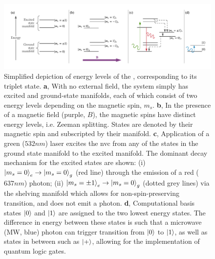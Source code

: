\begin{figure}
    \begin{center}
        \includegraphics[width=0.75\linewidth]{experimental_study/figures/nv_centre_cartoon.pdf}
    \end{center}
    \caption[ energy levels.]{
        Simplified depiction of energy levels of the , corresponding to its triplet state. 
        \textbf{a}, With no external field, the system simply has excited and ground-state manifolds, 
        each of which consist of two energy levels depending on the magnetic spin, $m_s$.
        \textbf{b}, In the presence of a magnetic field (purple, $B$), the magnetic spins have distinct energy levels, 
        i.e. Zeeman splitting. 
        States are denoted by their magnetic spin and subscripted by their manifold. 
        \textbf{c},  Application of a green ($532nm$) laser excites the \gls{nvc} from any of the states in the 
        ground state manifold to the excited manifold. 
        The dominant decay mechanism for the excited states are shown: 
            (i) $\ket{m_s=0}_e \rightarrow \ket{m_s=0}_g$ (red line) through the emission of a red ($637nm$) photon;
            (ii) $\ket{m_s=\pm 1}_e \rightarrow \ket{m_s=0}_g$ (dotted grey lines) via the shelving manifold which allows for non-spin-preserving transition, 
            and does not emit a photon. 
        \textbf{d}, Computational basis states $\ket{0}$ and $\ket{1}$ are assigned to the two lowest energy states.
            The difference in energy between these states is such that a microwave (MW, blue) photon
            can trigger transition from $\ket{0}$ to $\ket{1}$, as well as states in between such as $\ket{+}$, 
            allowing for the implementation of quantum logic gates. 
    }
    \label{fig:nv_centre_energy_levels}
\end{figure}


